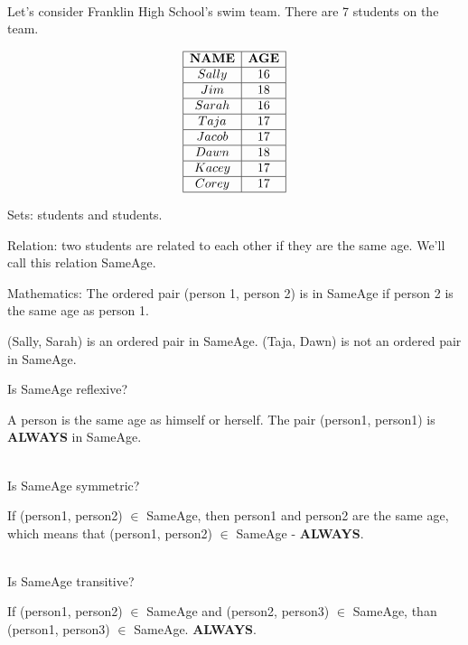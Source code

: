 \documentclass{ximera}
\begin{document}
\begin{example} 
\quad \\
Let's consider Franklin High School's swim team. There are 7 students on the team.

\begin{center}
\[
\begin{array}{|c|c|}
\hline
\textbf{NAME} & \textbf{AGE} \\\hline
Sally & 16 \\\hline
Jim & 18 \\\hline
Sarah & 16 \\\hline
Taja & 17 \\\hline
Jacob & 17 \\\hline
Dawn & 18 \\\hline
Kacey & 17 \\\hline
Corey & 17 \\\hline
\end{array}
\]
\end{center}

Sets: students and students.

Relation: two students are related to each other if they are the same age. We'll call this relation SameAge.

Mathematics: The ordered pair (person 1, person 2) is in SameAge if person 2 is the same age as person 1. 

(Sally, Sarah) is an ordered pair in SameAge.  (Taja, Dawn) is not an ordered pair in SameAge.

Is SameAge reflexive?  
\begin{multipleChoice}
\end{multipleChoice}
\begin{feedback}
A person is the same age as himself or herself. The pair (person1, person1) is \textbf{ALWAYS} in SameAge.
\end{feedback}
\quad \\

Is SameAge symmetric? 
\begin{multipleChoice}
\end{multipleChoice}
\begin{feedback}
If (person1, person2) $\in$ SameAge, then person1 and person2 are the same age, which means that  (person1, person2) $\in$ SameAge - \textbf{ALWAYS}.
\end{feedback}
\quad \\

Is SameAge transitive? 
\begin{multipleChoice}
\end{multipleChoice}
\begin{feedback}
If (person1, person2) $\in$ SameAge and (person2, person3) $\in$ SameAge, than (person1, person3) $\in$ SameAge. \textbf{ALWAYS}.  
\end{feedback}


\end{example}
\quad \\
\end{document}
